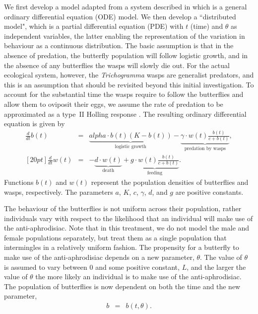 \documentclass[review,authoryear]{elsarticle}
\def\alpha{alpha}%
\newcommand{\origB}{{b}}
\newcommand{\origW}{{w}}
\newcommand{\origAlpha}{{\alpha}}
\newcommand{\origK}{{K}}
\newcommand{\origGamma}{{\gamma}}
\newcommand{\origA}{{a}}
\newcommand{\origC}{{c}}
\newcommand{\origD}{{d}}
\newcommand{\origG}{{g}}
\newcommand{\origL}{{L}}
\newcommand{\origTheta}{{\theta}}
\newcommand{\origT}{{t}}
\begin{document}
We first develop a model adapted from a system described in \cite{TEWA20134825} which is a general ordinary differential equation (ODE) model. We then develop a ``distributed model", which is a partial differential equation (PDE) with $t$ (time) and $\theta$ as independent variables, the latter enabling the representation of the variation in behaviour as a continuous distribution. The basic assumption is that in the absence of predation, the
butterfly population will follow logistic
growth, and in the absence of any butterflies the wasps will slowly die
out. For the actual ecological system, however, the \textit{Trichogramma}
wasps are generalist predators, and this is an assumption that should
be revisited beyond this initial investigation.  To account for the
substantial time the wasps require to follow the butterflies and allow
them to oviposit their eggs, we assume the rate of predation to be
approximated as a type~II Holling response \citep{TEWA20134825,holling_1959A,holling_1959B}.  The
resulting ordinary differential equation is given by
\begin{eqnarray}
  \label{eq:initialSystem1}
  \frac{d}{d\origT} \origB(\origT) & = & \underbrace{\origAlpha \cdot \origB(\origT) (\origK - \origB(\origT))}_\text{logistic growth}
                               - \underbrace{\origGamma \cdot \origW(\origT) \frac{\origB(\origT)}{\origC+\origB(\origT)}}_\text{predation by wasps}, \\ [20pt]
  \label{eq:initialSystem2}
  \frac{d}{d\origT} \origW(\origT) & = & -\underbrace{\origD \cdot \origW(\origT)}_\text{death} + \underbrace{\origG \cdot \origW(\origT) \frac{\origB(\origT)}{\origC+\origB(\origT)}}_\text{feeding}.
\end{eqnarray}
Functions
$\origB(\origT)$ and $\origW(\origT)$ represent the population densities of butterflies and wasps, respectively. The parameters $\origA$, $\origK$, $\origC$,
$\origGamma$, $\origD$, and $\origG$ are positive constants. 
 
The behaviour of the butterflies is not uniform across their population, rather individuals vary with respect to the likelihood that an individual will make use of the anti-aphrodisiac. 
Note that in this treatment, we do not model the male and female populations separately, but treat
them as a single population that intermingles in a relatively uniform
fashion. The propensity for a butterfly to make use of the
anti-aphrodisiac depends on a new parameter, $\origTheta$. The value of
$\origTheta$ is assumed to vary between $0$ and some positive constant,
$\origL$, and the larger the value of $\origTheta$ the more likely an
individual is to make use of the anti-aphrodisiac. The population of butterflies is now dependent on both the time and
the new parameter,
\begin{eqnarray}
  \origB & = & \origB(\origT,\origTheta).
\end{eqnarray}
\end{document}
